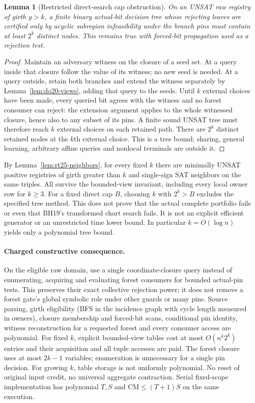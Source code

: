 \documentclass[11pt]{article}
\newtheorem{lemma}[theorem]{Lemma}
\begin{document}
\begin{lemma}[Restricted direct-search cap obstruction]\label{lem:do20-cap}
On an UNSAT raw registry of girth $g>k$, a finite binary actual-bit decision tree whose rejecting leaves are certified only by acyclic subregion infeasibility under the branch pins must contain at least $2^k$ distinct nodes. This remains true with forced-bit propagation used as a rejection test.
\end{lemma}
\begin{proof}
Maintain an adversary witness on the closure of a seed set. At a query inside that closure follow the value of its witness; no new seed is needed. At a query outside, retain both branches and extend the witness separately by Lemma~\ref{lem:do20-views}, adding that query to the seeds. Until $k$ external choices have been made, every queried bit agrees with the witness and no forest consumer can reject: the extension argument applies to the whole witnessed closure, hence also to any subset of its pins. A finite sound UNSAT tree must therefore reach $k$ external choices on each retained path. There are $2^k$ distinct retained nodes at the $k$th external choice. This is a tree bound; sharing, general learning, arbitrary affine queries and nonlocal terminals are outside it.
\end{proof}
By Lemma~\ref{lem:rt25-neighbors}, for every fixed $k$ there are minimally UNSAT positive registries of girth greater than $k$ and single-sign SAT neighbors on the same triples. All survive the bounded-view invariant, including every local owner row for $k\ge3$. For a fixed direct cap $B$, choosing $k$ with $2^k>B$ excludes the specified tree method. This does not prove that the actual complete portfolio fails or even that BH19's transformed chart search fails. It is not an explicit efficient generator or an unrestricted time lower bound. In particular $k=O(\log n)$ yields only a polynomial tree bound.

\paragraph{Charged constructive consequence.}
On the eligible raw domain, use a single coordinate-closure query instead of enumerating, acquiring and evaluating forest consumers for bounded actual-pin tests. This preserves their exact collective rejection power; it does not remove a forest gate's global symbolic role under other guards or many pins. Source parsing, girth eligibility (BFS in the incidence graph with cycle length measured in owners), closure membership and forced-bit scans, conditional pin identity, witness reconstruction for a requested forest and every consumer access are polynomial. For fixed $k$, explicit bounded-view tables cost at most $O(n^k2^k)$ entries and their acquisition and all tuple accesses are paid. The forest closure uses at most $2k-1$ variables; enumeration is unnecessary for a single pin decision. For growing $k$, table storage is not uniformly polynomial. No reset of original input credit, no universal aggregate contraction. Serial fixed-scope implementation has polynomial $T,S$ and $\mathrm{CM}\le(T+1)S$ on the same execution.
\end{document}
